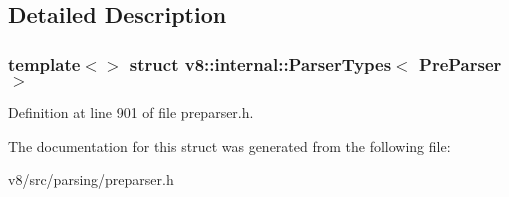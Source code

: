 \subsection{Detailed Description}
\subsubsection*{template$<$$>$\newline
struct v8\+::internal\+::\+Parser\+Types$<$ Pre\+Parser $>$}



Definition at line 901 of file preparser.\+h.



The documentation for this struct was generated from the following file\+:\begin{DoxyCompactItemize}
\item 
v8/src/parsing/preparser.\+h\end{DoxyCompactItemize}
